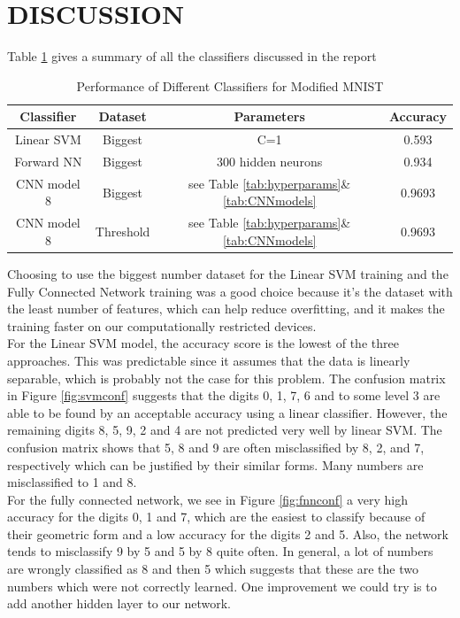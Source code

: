 \documentclass[letterpaper, 10 pt, conference]{ieeeconf}  %
\begin{document}
\section{DISCUSSION}
Table \ref{tab:perfAll} gives a summary of all the classifiers discussed in the report
\begin{table}
	\centering
	\caption{Performance of Different Classifiers for Modified MNIST}
	\label{tab:perfAll}
	\begin{tabular}{cccc}
		\hline
		Classifier & Dataset& Parameters & Accuracy\\\hline
		Linear SVM & Biggest &C=1 & 0.593\\
		Forward NN & Biggest & 300 hidden neurons &0.934\\
		CNN model 8& Biggest & see Table \ref{tab:hyperparams}\&\ref{tab:CNNmodels} &0.9693\\	
		CNN model 8& Threshold & see Table \ref{tab:hyperparams}\&\ref{tab:CNNmodels} &0.9693\\					
	\end{tabular}
\end{table}

Choosing to use the biggest number dataset for the Linear SVM training and the Fully Connected Network training was a good choice because it's the dataset with the least number of features, which can help reduce overfitting, and it makes the training faster on our computationally restricted devices. \\
For the Linear SVM model, the accuracy score is the lowest of the three approaches. This was predictable since it assumes that the data is linearly separable, which is probably not the case for this problem. The confusion matrix in Figure \ref{fig:svmconf} suggests that the digits 0, 1, 7, 6 and to some level 3 are able to be found by an acceptable accuracy using a linear classifier. However, the remaining digits 8, 5, 9, 2 and 4 are not predicted very well by linear SVM. The confusion matrix shows that 5, 8 and 9 are often misclassified by 8, 2, and 7, respectively which can be justified by their similar forms. Many numbers are misclassified to 1 and 8.\\
For the fully connected network, we see in Figure \ref{fig:fnnconf} a very high accuracy for the digits 0, 1 and 7, which are the easiest to classify because of their geometric form and a low accuracy for the digits 2 and 5. Also, the network tends to misclassify 9 by 5 and 5 by 8 quite often. In general, a lot of numbers are wrongly classified as 8 and then 5 which suggests that these are the two numbers which were not correctly learned.
One improvement we could try is to add another hidden layer to our network. \\
\end{document}
